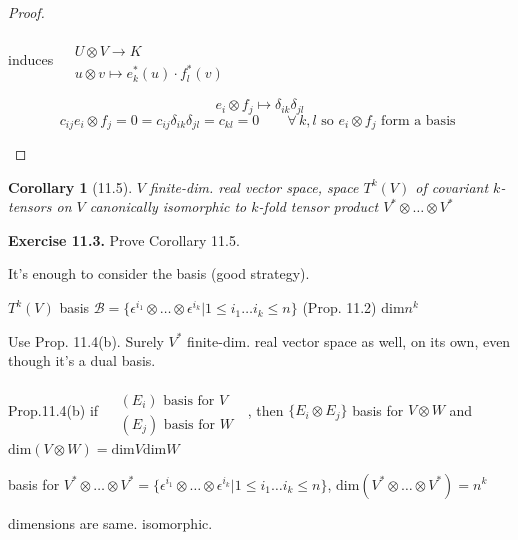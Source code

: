 \documentclass[11pt]{amsart}
\newtheorem{corollary}{Corollary}
\theoremstyle{definition}
\newcommand{\exercisehead}[1]{\medskip\noindent\textbf{Exercise #1.} }
\begin{document}
\begin{proof}
\begin{enumerate}
induces $\begin{aligned} & \quad \\
  & U\otimes V \to K \\
   & u \otimes v \mapsto e^*_k(u) \cdot f_l^*(v) \end{aligned}$

\[
e_i \otimes f_j \mapsto \delta_{ik} \delta_{jl}
\]
\[
c_{ij} e_i \otimes f_j = 0 = c_{ij} \delta_{ik} \delta_{jl} = c_{kl} = 0 \quad \quad \forall \, k,l \text{ so } e_i\otimes f_j \text{ form a basis }
\]

\end{enumerate}
\end{proof}



\begin{corollary}[11.5] $V$ finite-dim. real vector space, space $T^k(V)$ of covariant $k$-tensors on $V$ canonically isomorphic to $k$-fold tensor product $V^* \otimes \dots \otimes V^*$
\end{corollary}

\exercisehead{11.3} Prove Corollary 11.5.

It's enough to consider the basis (good strategy).

$T^k(V)$ basis $\mathcal{B} = \lbrace \epsilon^{i_1} \otimes \dots \otimes \epsilon^{i_k} | 1 \leq i_1 \dots i_k \leq n \rbrace$ (Prop. 11.2) $\text{dim}{n^k}$

Use Prop. 11.4(b).  Surely $V^*$ finite-dim. real vector space as well, on its own, even though it's a dual basis.

Prop.11.4(b) if $\begin{aligned} & \quad \\
& (E_i) \text{ basis for $V$ } \\
  & (E_j) \text{ basis for $W$ } \end{aligned}$, \quad then $\lbrace E_i \otimes E_j \rbrace$ basis for $V\otimes W$ and $\text{dim}{ (V\otimes W)} = \text{dim}{V} \text{dim}{W}$

basis for $V^* \otimes \dots \otimes V^* = \lbrace \epsilon^{i_1} \otimes \dots \otimes \epsilon^{i_k} | 1 \leq i_1 \dots i_k \leq n \rbrace$, \quad $\text{dim}{ (V^* \otimes \dots \otimes V^*) } = n^k$

dimensions are same.  isomorphic.



\end{document}
